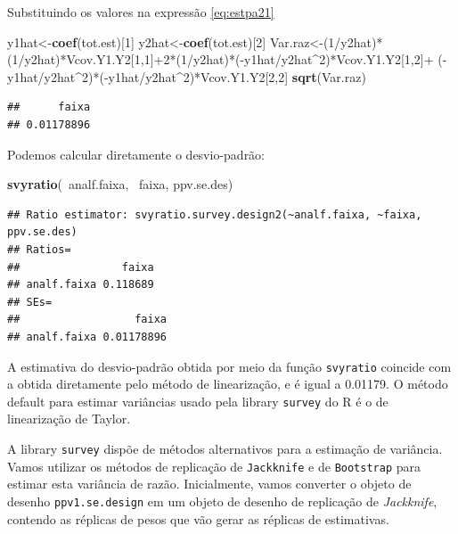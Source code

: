 \documentclass[]{book}
\newenvironment{Shaded}{\begin{snugshade}}{\end{snugshade}}
\newcommand{\KeywordTok}[1]{\textcolor[rgb]{0.13,0.29,0.53}{\textbf{{#1}}}}
\newcommand{\DecValTok}[1]{\textcolor[rgb]{0.00,0.00,0.81}{{#1}}}
\newcommand{\NormalTok}[1]{{#1}}
\numberwithin{example}{chapter}
\numberwithin{remark}{chapter}
\numberwithin{definition}{chapter}
\begin{document}
Substituindo os valores na expressão \eqref{eq:estpa21}

\begin{Shaded}
\begin{Highlighting}[]
\NormalTok{y1hat<-}\KeywordTok{coef}\NormalTok{(tot.est)[}\DecValTok{1}\NormalTok{]}
\NormalTok{y2hat<-}\KeywordTok{coef}\NormalTok{(tot.est)[}\DecValTok{2}\NormalTok{]}
\NormalTok{Var.raz<-(}\DecValTok{1}\NormalTok{/y2hat)*(}\DecValTok{1}\NormalTok{/y2hat)*Vcov.Y1.Y2[}\DecValTok{1}\NormalTok{,}\DecValTok{1}\NormalTok{]+}\DecValTok{2}\NormalTok{*(}\DecValTok{1}\NormalTok{/y2hat)*(-y1hat/y2hat^}\DecValTok{2}\NormalTok{)*Vcov.Y1.Y2[}\DecValTok{1}\NormalTok{,}\DecValTok{2}\NormalTok{]+}
\NormalTok{(-y1hat/y2hat^}\DecValTok{2}\NormalTok{)*(-y1hat/y2hat^}\DecValTok{2}\NormalTok{)*Vcov.Y1.Y2[}\DecValTok{2}\NormalTok{,}\DecValTok{2}\NormalTok{]}
\KeywordTok{sqrt}\NormalTok{(Var.raz)}
\end{Highlighting}
\end{Shaded}

\begin{verbatim}
##      faixa 
## 0.01178896
\end{verbatim}

Podemos calcular diretamente o desvio-padrão:

\begin{Shaded}
\begin{Highlighting}[]
\KeywordTok{svyratio}\NormalTok{(~analf.faixa, ~faixa, ppv.se.des)}
\end{Highlighting}
\end{Shaded}

\begin{verbatim}
## Ratio estimator: svyratio.survey.design2(~analf.faixa, ~faixa, ppv.se.des)
## Ratios=
##                faixa
## analf.faixa 0.118689
## SEs=
##                  faixa
## analf.faixa 0.01178896
\end{verbatim}

A estimativa do desvio-padrão obtida por meio da função
\texttt{svyratio} coincide com a obtida diretamente pelo método de
linearização, e é igual a 0.01179. O método default para estimar
variâncias usado pela library \texttt{survey} \citep{R-survey} do R é o
de linearização de Taylor.

A library \texttt{survey} dispõe de métodos alternativos para a
estimação de variância. Vamos utilizar os métodos de replicação de
\texttt{Jackknife} e de \texttt{Bootstrap} para estimar esta variância
de razão. Inicialmente, vamos converter o objeto de desenho
\texttt{ppv1.se.design} em um objeto de desenho de replicação de
\emph{Jackknife}, contendo as réplicas de pesos que vão gerar as
réplicas de estimativas.
\end{document}
